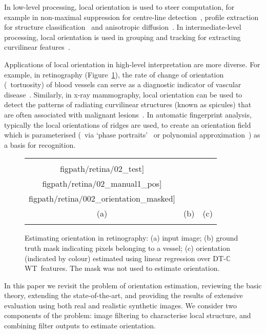 \documentclass[10pt,twocolumn,letterpaper]{article}
\newcommand{\fref}[1]{Figure~\ref{#1}}
\def\dtcwt{DT-$\mathbb{C}$WT}
\begin{document}
In low-level processing, local orientation is used to steer computation, for example in non-maximal suppression for centre-line detection~\cite{Sonka_99}, profile extraction for structure classification~\cite{Zwiggelaar_etal_TMI04} and anisotropic diffusion~\cite{Perona_PAMI90}.  In intermediate-level processing, local orientation is used in grouping and tracking for extracting curvilinear features~\cite{Aylward_Bullitt_TMI02, Staal_etal_TMI04}.

Applications of local orientation in high-level interpretation are more diverse. For example, in retinography (\fref{f:retinography}), the rate of change of orientation (\ie~tortuosity) of blood vessels can serve as a diagnostic indicator of vascular disease~\cite{Hart_etal_IJMI99}. Similarly, in x-ray mammography, local orientation can be used to detect the patterns of radiating curvilinear structures (known as spicules) that are often associated with malignant lesions~\cite{Zwiggelaar_etal_MIA99, Karssemeijer_teBrake_TMI96,Rangayyan_Ayres_MBEC06}. In automatic fingerprint analysis, typically the local orientations of ridges are used, to create an orientation field~\cite{Bazen_Gerez_TPAMI02,Mei_etal_IVC09} which is parameterised (\eg~via `phase portraits'~\cite{Li_etal_PR06} or polynomial approximation~\cite{Gu_etal_PR04}) as a basis for recognition.


\begin{figure}[t]
\centering
\begin{tabular}{@{}c c c@{}}
\texttt{[image: \\figpath/retina/02\_test]} &
\texttt{[image: \\figpath/retina/02\_manual1\_pos]} &
\texttt{[image: \\figpath/retina/002\_orientation\_masked]} \\
(a) & (b) & (c) \\
\noalign{\smallskip}
\end{tabular}
%
\caption{Estimating orientation in retinography: %
(a) input image; %
(b) ground truth mask indicating pixels belonging to a vessel; %
(c) orientation (indicated by colour) estimated using linear regression over \dtcwt~features. The mask was not used to estimate orientation. %
}
\label{f:retinography}
\end{figure}


In this paper we revisit the problem of orientation estimation, reviewing the basic theory, extending the state-of-the-art, and providing the results of extensive evaluation using both real and realistic synthetic images. We consider two components of the problem: image filtering to characterise local structure, and combining filter outputs to estimate orientation.
\end{document}
